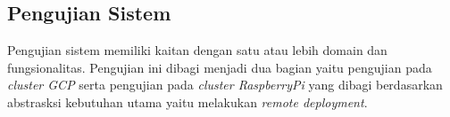 \subsection{Pengujian Sistem}
Pengujian sistem memiliki kaitan dengan satu atau lebih domain dan fungsionalitas. Pengujian ini dibagi menjadi dua bagian yaitu pengujian pada \textit{cluster GCP} serta pengujian pada \textit{cluster RaspberryPi} yang dibagi berdasarkan abstrasksi kebutuhan utama yaitu melakukan \textit{remote deployment}.





